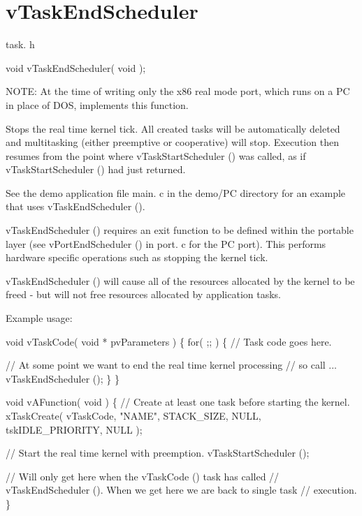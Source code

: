 \hypertarget{group__v_task_end_scheduler}{}\section{v\+Task\+End\+Scheduler}
\label{group__v_task_end_scheduler}
task. h 
\begin{DoxyPre}void vTaskEndScheduler( void );\end{DoxyPre}


N\+O\+T\+E\+: At the time of writing only the x86 real mode port, which runs on a P\+C in place of D\+O\+S, implements this function.

Stops the real time kernel tick. All created tasks will be automatically deleted and multitasking (either preemptive or cooperative) will stop. Execution then resumes from the point where v\+Task\+Start\+Scheduler () was called, as if v\+Task\+Start\+Scheduler () had just returned.

See the demo application file main. c in the demo/\+P\+C directory for an example that uses v\+Task\+End\+Scheduler ().

v\+Task\+End\+Scheduler () requires an exit function to be defined within the portable layer (see v\+Port\+End\+Scheduler () in port. c for the P\+C port). This performs hardware specific operations such as stopping the kernel tick.

v\+Task\+End\+Scheduler () will cause all of the resources allocated by the kernel to be freed -\/ but will not free resources allocated by application tasks.

Example usage\+: 
\begin{DoxyPre}
void vTaskCode( void * pvParameters )
\{
    for( ;; )
    \{
     // Task code goes here.\end{DoxyPre}



\begin{DoxyPre}     // At some point we want to end the real time kernel processing
     // so call ...
     vTaskEndScheduler ();
    \}
\}\end{DoxyPre}



\begin{DoxyPre}void vAFunction( void )
\{
    // Create at least one task before starting the kernel.
    xTaskCreate( vTaskCode, "NAME", STACK\_SIZE, NULL, tskIDLE\_PRIORITY, NULL );\end{DoxyPre}



\begin{DoxyPre}    // Start the real time kernel with preemption.
    vTaskStartScheduler ();\end{DoxyPre}



\begin{DoxyPre}    // Will only get here when the vTaskCode () task has called
    // vTaskEndScheduler ().  When we get here we are back to single task
    // execution.
\}
  \end{DoxyPre}
 